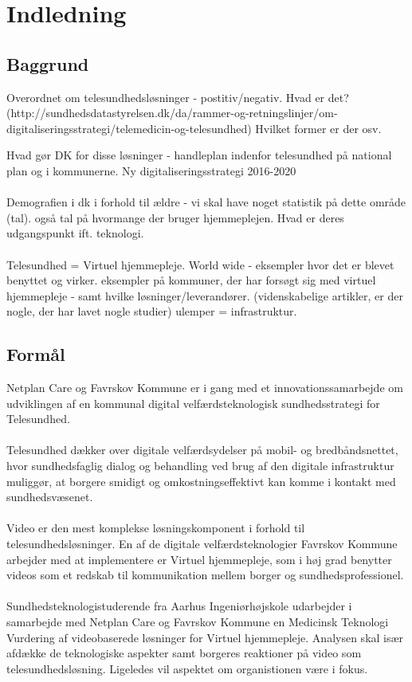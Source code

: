 \chapter{Indledning}

\section{Baggrund}
Overordnet om telesundhedsløsninger - postitiv/negativ. Hvad er det? (http://sundhedsdatastyrelsen.dk/da/rammer-og-retningslinjer/om-digitaliseringsstrategi/telemedicin-og-telesundhed) Hvilket former er der osv. 


Hvad gør DK for disse løsninger - handleplan indenfor telesundhed på national plan og i kommunerne. Ny digitaliseringsstrategi 2016-2020
\\ \\
Demografien i dk i forhold til ældre - vi skal have noget statistik på dette område (tal). også tal på hvormange der bruger hjemmeplejen. Hvad er deres udgangspunkt ift. teknologi. 
\\ \\
Telesundhed = Virtuel hjemmepleje. World wide - eksempler hvor det er blevet benyttet og virker. eksempler på kommuner, der har forsøgt sig med virtuel hjemmepleje - samt hvilke løsninger/leverandører. (videnskabelige artikler, er der nogle, der har lavet nogle studier) 
ulemper = infrastruktur.
 

\section{Formål}
Netplan Care og Favrskov Kommune er i gang med et innovationssamarbejde om udviklingen af en kommunal digital velfærdsteknologisk sundhedsstrategi for Telesundhed. 
\\ \\
Telesundhed dækker over digitale velfærdsydelser på mobil- og bredbåndsnettet, hvor sundhedsfaglig dialog og behandling ved brug af den digitale infrastruktur muliggør, at borgere smidigt og omkostningseffektivt kan komme i kontakt med sundhedsvæsenet.    
\\ \\
Video er den mest komplekse løsningskomponent i forhold til telesundhedsløsninger. En af de digitale velfærdsteknologier Favrskov Kommune arbejder med at implementere er Virtuel hjemmepleje, som i høj grad benytter videos som et redskab til kommunikation mellem borger og sundhedsprofessionel. 
\\ \\
Sundhedsteknologistuderende fra Aarhus Ingeniørhøjskole udarbejder i samarbejde med Netplan Care og Favrskov Kommune en Medicinsk Teknologi Vurdering af videobaserede løsninger for Virtuel hjemmepleje. Analysen skal især afdække de teknologiske aspekter samt borgeres reaktioner på video som telesundhedsløsning. Ligeledes vil aspektet om organistionen være i fokus. 

